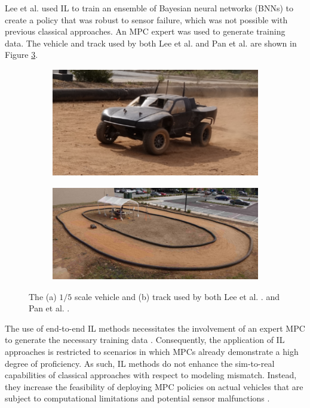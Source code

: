 Lee et al. \cite{lee2019} used IL to train an ensemble of Bayesian neural networks (BNNs) to create a policy that was robust to sensor failure, which was not possible with previous classical approaches. 
An MPC expert was used to generate training data.
The vehicle and track used by both Lee et al. \cite{lee2019} and Pan et al. \cite{Pan2017a} are shown in Figure \ref{fig:lee_car_track}.

\begin{figure}[htb!]
    \centering
    \begin{subfigure}[htb!]{0.48\textwidth}
        \centering
        \includegraphics[height=.45\linewidth]{contents/chapt2/figs/IL_car.png}
        \caption[]{}
        \label{fig:IL_car}
    \end{subfigure}
    \hfill
    \begin{subfigure}[htb!]{0.48\textwidth}
        \centering
        \includegraphics[height=.45\linewidth]{contents/chapt2/figs/IL_track.png}
        \caption[]{}
        \label{fig:IL_track}
    \end{subfigure}
    \hfill
    \caption[The car and track used by Lee et al.]{The (a) $1/5$ scale vehicle and (b) track used by both Lee et al. \cite{lee2019}. and Pan et al. \cite{Pan2017a}.}
\label{fig:lee_car_track}
\end{figure}

The use of end-to-end IL methods necessitates the involvement of an expert MPC to generate the necessary training data \cite{Pan2017}. 
Consequently, the application of IL approaches is restricted to scenarios in which MPCs already demonstrate a high degree of proficiency. 
As such, IL methods do not enhance the sim-to-real capabilities of classical approaches with respect to modeling mismatch. 
Instead, they increase the feasibility of deploying MPC policies on actual vehicles that are subject to computational limitations and potential sensor malfunctions \cite{lee2019, Pan2017}.

